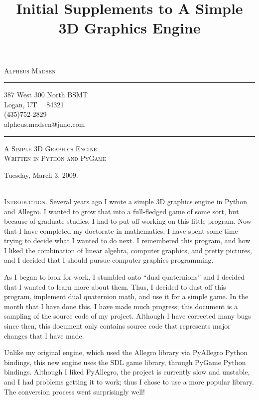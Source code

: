 \documentclass[10pt]{article}
\title{Initial Supplements to A Simple 3D Graphics Engine}
\author{\headerstuff}
\date{}
\makeatletter
\newcommand{\titleize}[1]{
   \begin{center}
       \Large \textsc{#1} \normalsize \\
   \end{center}
}
\newcommand{\normaltitleize}[1]{\mbox{}\\ \textsc{#1} \normalsize}
\newcommand{\headerstuff}{
   \begin{center}
   \textsc{\Large{Alpheus Madsen}}

   \rule{1in}{.01in}

   387 West 300 North BSMT \\

   Logan, UT \ \ 84321  \\

   (435)752-2829 \\

   alpheus.madsen@juno.com

   \rule{2in}{.01in}
   \end{center}
}
\makeatother
\begin{document}

\headerstuff

\titleize{A Simple 3D Graphics Engine\\Written in Python and PyGame}

\begin{center}
   Tuesday, March 3, 2009.
\end{center}

\normaltitleize{Introduction.}  Several years ago I wrote a simple 3D graphics engine in Python and Allegro.  I wanted to grow that into a full-fledged game of some sort, but because of graduate studies, I had to put off working on this little program.  Now that I have completed my doctorate in mathematics, I have spent some time trying to decide what I wanted to do next.  I remembered this program, and how I liked the combination of linear algebra, computer graphics, and pretty pictures, and I decided that I should pursue computer graphics programming.

As I began to look for work, I stumbled onto ``dual quaternions'' and I decided that I wanted to learn more about them.  Thus, I decided to dust off this program, implement dual quaternion math, and use it for a simple game.  In the month that I have done this, I have made much progress; this document is a sampling of the source code of my project.  Although I have corrected many bugs since then, this document only contains source code that represents major changes that I have made.

Unlike my original engine, which used the Allegro library via PyAllegro Python bindings, this new engine uses the SDL game library, through PyGame Python bindings.  Although I liked PyAllegro, the project is currently slow and unstable, and I had problems getting it to work; thus I chose to use a more popular library.  The conversion process went surprisingly well!
\end{document}

